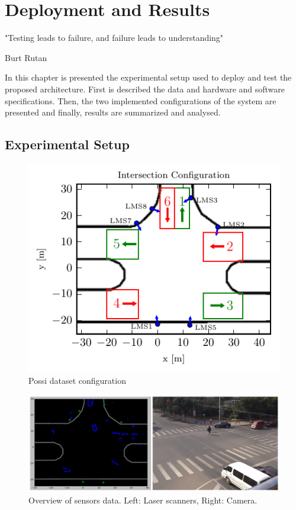 \chapter [Deployment and Results]{Deployment and Results}

\epigraph{"Testing leads to failure, and failure leads to understanding"}{Burt Rutan}

In this chapter is presented the experimental setup used to deploy and test the proposed architecture. First is described the data and hardware and software specifications. Then, the two implemented configurations of the system are presented and finally, results are summarized and analysed.

\section{Experimental Setup}

\begin{figure}[ht!]
\centering
\includegraphics[scale=0.8]{fig/4/intersection-config2.pdf}
\caption{Possi dataset configuration}
\label{possi_img}
\end{figure}

\begin{figure}[ht!]
\centering
\includegraphics[scale=0.2]{fig/4/sensors_overview.jpeg}
\caption{Overview of sensors data. Left: Laser scanners, Right: Camera.}
\label{possi_sensors}
\end{figure}

